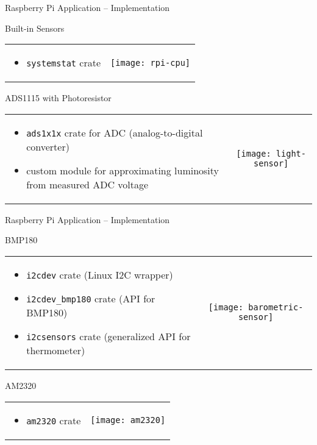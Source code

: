 \documentclass[aspectratio=169]{beamer}
\begin{document}
  \begin{frame}{Raspberry Pi Application -- Implementation}
    \begin{block}{Built-in Sensors}
      \begin{tabularx}{\textwidth}{XC}
        \begin{itemize}
          \item \texttt{systemstat} crate
        \end{itemize}
        &
        \texttt{[image: rpi-cpu]}
      \end{tabularx}
    \end{block}

    \begin{block}{ADS1115 with Photoresistor}
      \begin{tabularx}{\textwidth}{XC}
        \begin{itemize}
          \item \texttt{ads1x1x} crate for ADC (analog-to-digital converter)
          \item custom module for approximating luminosity from measured ADC voltage
        \end{itemize}
        &
        \texttt{[image: light-sensor]}
      \end{tabularx}
    \end{block}
  \end{frame}

  \begin{frame}{Raspberry Pi Application -- Implementation}
    \begin{block}{BMP180}
      \begin{tabularx}{\textwidth}{XC}
        \begin{itemize}
          \item \texttt{i2cdev} crate (Linux I2C wrapper)
          \item \texttt{i2cdev\_bmp180} crate (API for BMP180)
          \item \texttt{i2csensors} crate (generalized API for thermometer)
        \end{itemize}
        &
        \texttt{[image: barometric-sensor]}
      \end{tabularx}
    \end{block}

    \begin{block}{AM2320}
      \begin{tabularx}{\textwidth}{XC}
        \begin{itemize}
          \item \texttt{am2320} crate
        \end{itemize}
        &
        \texttt{[image: am2320]}
      \end{tabularx}
    \end{block}
  \end{frame}
\end{document}
